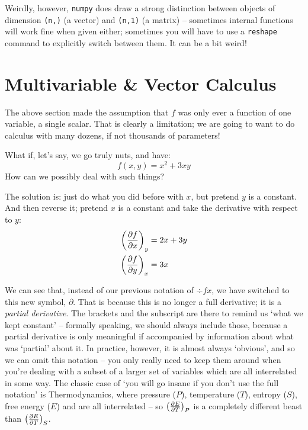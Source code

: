 \documentclass[a4paper,openany,11pt]{book}
\renewcommand\vec[1]{\boldsymbol{\mathbf{#1}}}
\begin{document}
					Weirdly, however, \verb|numpy| does draw a strong distinction between objects of dimension \verb|(n,)| (a vector) and \verb|(n,1)| (a matrix) -- sometimes internal functions will work fine when given either; sometimes you will have to use a \verb|reshape| command to explicitly switch between them. It can be a bit weird!

		
		\chapter{Multivariable \& Vector Calculus}

			The above section made the assumption that $f$ was only ever a function of one variable, a single scalar. That is clearly a limitation; we are going to want to do calculus with many dozens, if not thousands of parameters!
			
			
			What if, let's say, we go truly nuts, and have:
			\begin{equation}
				f(x,y) = x^2 + 3xy
			\end{equation}
			How can we possibly deal with such things?
	
			The solution is: just do what you did before with $x$, but pretend $y$ is a constant. And then reverse it; pretend $x$ is a constant and take the derivative with respect to $y$:
			\begin{align}
				\left(\frac{\partial f}{\partial x} \right)_y& = 2x + 3 y
				\\
				\left(\frac{\partial f}{\partial y}\right)_x & = 3 x
			\end{align}
	
			We can see that, instead of our previous notation of $\div{f}{x}$, we have switched to this new symbol, $\partial$. That is because this is no longer a full derivative; it is a \textit{partial derivative}. The brackets and the subscript are there to remind us `what we kept constant' -- formally speaking, we should always include those, because a partial derivative is only meaningful if accompanied by information about what was `partial' about it. In practice, however, it is almost always `obvious', and so we can omit this notation -- you only really need to keep them around when you're dealing with a subset of a larger set of variables which are all interrelated in some way. The classic case of `you will go insane if you don't use the full notation' is Thermodynamics, where pressure ($P$), temperature ($T$), entropy ($S$), free energy ($E$) and are all interrelated -- so $\left(\frac{\partial E}{\partial T} \right)_P$ is a completely different beast than $\left(\frac{\partial E}{\partial T}\right)_S$. 
\end{document}
